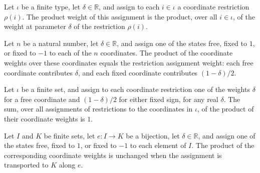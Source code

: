 \begin{definition}
\label{FABL.coordRestrictionProductWeight}
\leanok
{}
Let $\iota$ be a finite type, let $\delta\in\mathbb{R}$, and assign to each $i\in\iota$
a coordinate restriction $\rho(i)$. The product weight of this assignment is the
product, over all $i\in\iota$, of the weight at parameter $\delta$ of the restriction
$\rho(i)$.
\end{definition}

\begin{theorem}
\label{FABL.coordRestrictionProductWeight_fin}
\leanok
{}
Let $n$ be a natural number, let $\delta\in\mathbb{R}$, and assign one of the states
free, fixed to $1$, or fixed to $-1$ to each of the $n$ coordinates. The product of the
coordinate weights over these coordinates equals the restriction assignment weight: each
free coordinate contributes $\delta$, and each fixed coordinate contributes
$(1-\delta)/2$.
\end{theorem}

\begin{theorem}
\label{FABL.sum_coordRestrictionProductWeight}
\leanok
{}
Let $\iota$ be a finite set, and assign to each coordinate restriction one of the
weights $\delta$ for a free coordinate and $(1-\delta)/2$ for either fixed sign, for
any real $\delta$. The sum, over all assignments of restrictions to the coordinates in
$\iota$, of the product of their coordinate weights is $1$.
\end{theorem}

\begin{theorem}
\label{FABL.coordRestrictionProductWeight_reindex}
\leanok
{}
Let $I$ and $K$ be finite sets, let $e:I\to K$ be a bijection, let
$\delta\in\mathbb{R}$, and assign one of the states free, fixed to $1$, or fixed to
$-1$ to each element of $I$. The product of the corresponding coordinate weights is
unchanged when the assignment is transported to $K$ along $e$.
\end{theorem}


